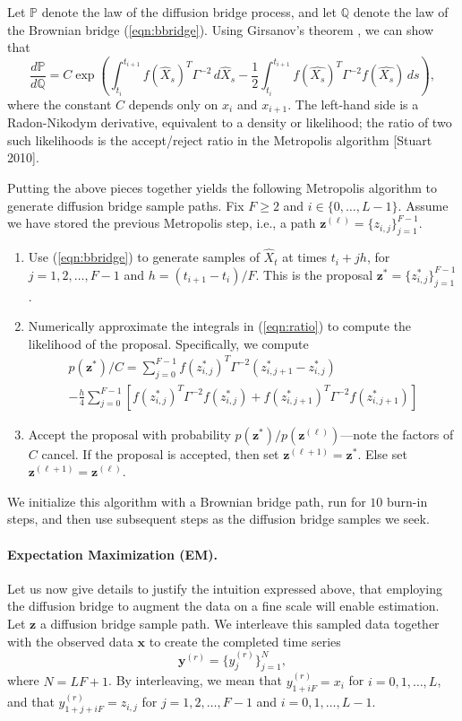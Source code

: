 \documentclass{article}
\newcommand{\bx}{\ensuremath{\mathbf{x}}}
\newcommand{\by}{\ensuremath{\mathbf{y}}}
\newcommand{\bz}{\ensuremath{\mathbf{z}}}
\begin{document}
Let $\mathbb{P}$ denote the law of the diffusion bridge process, and let $\mathbb{Q}$ denote the law of the Brownian bridge (\ref{eqn:bbridge}).  Using Girsanov's theorem \cite{papaspiliopoulos_importance_2012}, we can show that
\begin{equation}
\label{eqn:ratio}
\frac{d \mathbb{P}}{d \mathbb{Q}} = C \exp \left( \int_{t_i}^{t_{i+1}} f(\widehat{X}_s)^T \Gamma^{-2} \, d \widehat{X}_s - \frac{1}{2} \int_{t_i}^{t_{i+1}} f(\widehat{X_s})^T \Gamma^{-2} f(\widehat{X_s}) \, ds \right),
\end{equation}
where the constant $C$ depends only on $x_i$ and $x_{i+1}$.  The left-hand side is a Radon-Nikodym derivative, equivalent to a density or likelihood; the ratio of two such likelihoods is the accept/reject ratio in the Metropolis algorithm [Stuart 2010].  

Putting the above pieces together yields the following Metropolis algorithm to generate diffusion bridge sample paths.  Fix $F \geq 2$ and $i \in \{0, \ldots, L-1\}$.  Assume we have stored the previous Metropolis step, i.e., a path $\bz^{(\ell)} = \{z_{i,j}\}_{j=1}^{F-1}$.
\begin{enumerate}
\item Use (\ref{eqn:bbridge}) to generate samples of $\widehat{X}_t$ at times $t_i + j h$, for $j = 1, 2, \ldots, F-1$ and $h = (t_{i+1} - t_i)/F$.  This is the proposal $\bz^\ast = \{z^\ast_{i,j}\}_{j=1}^{F-1}$.
\item Numerically approximate the integrals in (\ref{eqn:ratio}) to compute the likelihood of the proposal.  Specifically, we compute
\begin{multline*}
p(\bz^\ast)/C = \sum_{j=0}^{F-1} f(z^\ast_{i,j})^T \Gamma^{-2} (z^\ast_{i,j+1} - z^\ast_{i,j}) \\ - \frac{h}{4} \sum_{j=0}^{F-1} \left[ f(z^\ast_{i,j})^T \Gamma^{-2} f(z^\ast_{i,j}) + f(z^\ast_{i,j+1})^T \Gamma^{-2} f(z^\ast_{i,j+1}) \right]
\end{multline*}
\item Accept the proposal with probability $p(\bz^\ast)/p(\bz^{(\ell)})$---note the factors of $C$ cancel.  If the proposal is accepted, then set $\bz^{(\ell+1)} = \bz^\ast$. Else set $\bz^{(\ell+1)} = \bz^{(\ell)}$.
\end{enumerate}
We initialize this algorithm with a Brownian bridge path, run for $10$ burn-in steps, and then use subsequent steps as the diffusion bridge samples we seek. 


\paragraph{Expectation Maximization (EM).} Let us now give details to justify the intuition expressed above, that employing the diffusion bridge to augment the data on a fine scale will enable estimation.  Let $\bz$ a diffusion bridge sample path.  We interleave this sampled data together with the observed data $\bx$ to create the completed time series
$$
\by^{(r)} = \{y_j^{(r)}\}_{j=1}^N,
$$
where $N = LF + 1$.  By interleaving, we mean that $y_{1 + i F}^{(r)} = x_i$ for $i = 0, 1, \ldots, L$, and that $y_{1 + j + i F}^{(r)} = z_{i, j}$ for $j = 1, 2, \ldots, F-1$ and $i = 0, 1, \ldots, L-1$.
\end{document}
